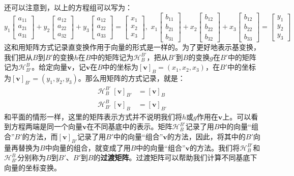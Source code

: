 \documentclass[12pt,UTF8]{ctexbook}
\begin{document}
还可以注意到，以上的方程组可以写为：
$$ 
y_1\begin{bmatrix}
    a_{11}\\ a_{21} \\ a_{31}
\end{bmatrix} + y_2 \begin{bmatrix}
    a_{12}\\ a_{22} \\ a_{32}
\end{bmatrix} + y_3 \begin{bmatrix}
    a_{12}\\ a_{22} \\ a_{33} 
\end{bmatrix} = \begin{bmatrix}
    x_1 \\ x_2 \\ x_3 
\end{bmatrix},\,\, x_1\begin{bmatrix}
    b_{11}\\ b_{21} \\ b_{31}
\end{bmatrix} + x_2 \begin{bmatrix}
    b_{12}\\ b_{22} \\ b_{32}
\end{bmatrix} + x_3 \begin{bmatrix}
    b_{12}\\ b_{22} \\ b_{33} 
\end{bmatrix} = \begin{bmatrix}
    y_1 \\ y_2 \\ y_3 
\end{bmatrix}
$$
这和用矩阵方式记录直变换作用于向量的形式是一样的。为了更好地表示基变换，我们把从$B$到$B'$的变换$h$在$B$中的矩阵记为$\mathcal{H}_B^{B'}$，把从$B'$到$B$的变换$g$在$B'$中的矩阵记为$\mathcal{H}_{B'}^B$。给定向量$\mathbf{v}$，记$\mathbf{v}$在$B$中的坐标为$[\mathbf{v}]_B = (x_1,x_2,x_3)$，在$B'$中的坐标为$[\mathbf{v}]_{B'} = (y_1,y_2,y_3)$。那么用矩阵的方式记录，就是：
\begin{align*}
    \mathcal{H}_B^{B'}~[\mathbf{v}]_{B'} &= [\mathbf{v}]_B \\
    \mathcal{H}_{B'}^B~[\mathbf{v}]_{B} &= [\mathbf{v}]_{B'} 
\end{align*}
和平面的情形一样，这里的矩阵表示方式并不说明我们将$h$或$g$作用在$\mathbf{v}$上。可以看到方程两端是同一个向量$\mathbf{v}$在不同基底中的表示。矩阵$\mathcal{H}_B^{B'}$记录了用$B$中的向量“组合”$B'$的方法，而$[\mathbf{v}]_{B'}$记录了用$B'$中的向量“组合”$\mathbf{v}$的方法，因此，将其中的$B'$向量再替换为$B$中向量的组合，就变成了用$B$中的向量“组合”$\mathbf{v}$的方法。我们将$\mathcal{H}_B^{B'}$和$\mathcal{H}_{B'}^B$分别称为$B$到$B'$、$B'$到$B$的\textbf{过渡矩阵}。过渡矩阵可以帮助我们计算不同基底下向量的坐标变换。
\end{document}
